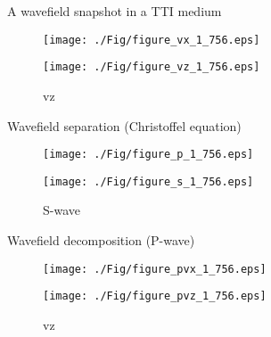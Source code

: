 \documentclass[aspectratio=169]{beamer}
\begin{document}
\begin{frame}{A wavefield snapshot in a TTI medium}
   \begin{figure}[ht]
        \begin{minipage}[b]{0.45\linewidth}
            \centering
            \texttt{[image: ./Fig/figure\_vx\_1\_756.eps]}
            \caption{vx}
        \end{minipage}
        \hspace{0.5cm}
        \begin{minipage}[b]{0.45\linewidth}
            \centering
            \texttt{[image: ./Fig/figure\_vz\_1\_756.eps]}
            \caption{vz}
        \end{minipage}
    \end{figure}

\end{frame}
\begin{frame}{Wavefield separation (Christoffel equation)}
   \begin{figure}[ht]
        \begin{minipage}[b]{0.45\linewidth}
            \centering
            \texttt{[image: ./Fig/figure\_p\_1\_756.eps]}
            \caption{P-wave}
        \end{minipage}
        \hspace{0.5cm}
        \begin{minipage}[b]{0.45\linewidth}
            \centering
            \texttt{[image: ./Fig/figure\_s\_1\_756.eps]}
            \caption{S-wave}
        \end{minipage}
    \end{figure}
\end{frame}
\begin{frame}{Wavefield decomposition (P-wave)}
   \begin{figure}[ht]
        \begin{minipage}[b]{0.45\linewidth}
            \centering
            \texttt{[image: ./Fig/figure\_pvx\_1\_756.eps]}
            \caption{vx}
        \end{minipage}
        \hspace{0.5cm}
        \begin{minipage}[b]{0.45\linewidth}
            \centering
            \texttt{[image: ./Fig/figure\_pvz\_1\_756.eps]}
            \caption{vz}
        \end{minipage}
    \end{figure}

\end{frame}
\end{document}
